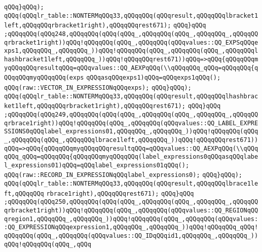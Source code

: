 \verb|qQQq}qQQq);|\newline
\verb|qQQq(qQQqlr_table::NONTERMqQQq33,qQQqqQQq(qQQqresult,qQQqqQQqlbracket1left,qQQqqQQqrbracket1right),qQQqqQQqrest671);|\newline
\verb|qQQq}qQQq|\newline
\verb|;qQQqqQQq(qQQq248,qQQqqQQq(qQQq(qQQq_,qQQqqQQq(qQQq_,qQQqqQQq_,qQQqqQQqrbracket1right))qQQq!qQQqqQQq(qQQq_,qQQqqQQq(qQQqvalues::QQ_EXPSqQQqexps1,qQQqqQQq_,qQQqqQQq_))qQQq!qQQqqQQq(qQQq_,qQQqqQQq(qQQq_,qQQqqQQqlhashbracket1left,qQQqqQQq_))qQQq!qQQqqQQqrest671))qQQq=>qQQq{qQQqqQQqmyqQQqqQQqresultqQQq=qQQqvalues::QQ_AEXPqQQq(\\qQQqqQQq_qQQq=qQQqqQQq{qQQqqQQqmyqQQqqQQq(exps|\newline
\verb|qQQqasqQQqexps1)qQQq=qQQqexps1qQQq();|\newline
\verb|qQQq(raw::VECTOR_IN_EXPRESSIONqQQqexps);|\newline
\verb|qQQq}qQQq);|\newline
\verb|qQQq(qQQqlr_table::NONTERMqQQq33,qQQqqQQq(qQQqresult,qQQqqQQqlhashbracket1left,qQQqqQQqrbracket1right),qQQqqQQqrest671);|\newline
\verb|qQQq}qQQq|\newline
\verb|;qQQqqQQq(qQQq249,qQQqqQQq(qQQq(qQQq_,qQQqqQQq(qQQq_,qQQqqQQq_,qQQqqQQqrbrace1right))qQQq!qQQqqQQq(qQQq_,qQQqqQQq(qQQqvalues::QQ_LABEL_EXPRESSIONS0qQQqlabel_expressions01,qQQqqQQq_,qQQqqQQq_))qQQq!qQQqqQQq(qQQq_,qQQqqQQq(qQQq_,qQQqqQQqlbrace1left,qQQqqQQq_))qQQq!qQQqqQQqrest671))qQQq=>qQQq{qQQqqQQqmyqQQqqQQqresultqQQq=qQQqvalues::QQ_AEXPqQQq(\\qQQq|\newline
\verb|qQQq_qQQq=qQQqqQQq{qQQqqQQqmyqQQqqQQq(label_expressions0qQQqasqQQqlabel_expressions01)qQQq=qQQqlabel_expressions01qQQq();|\newline
\verb|qQQq(raw::RECORD_IN_EXPRESSIONqQQqlabel_expressions0);|\newline
\verb|qQQq}qQQq);|\newline
\verb|qQQq(qQQqlr_table::NONTERMqQQq33,qQQqqQQq(qQQqresult,qQQqqQQqlbrace1left,qQQqqQQq|\newline
\verb|rbrace1right),qQQqqQQqrest671);|\newline
\verb|qQQq}qQQq|\newline
\verb|;qQQqqQQq(qQQq250,qQQqqQQq(qQQq(qQQq_,qQQqqQQq(qQQq_,qQQqqQQq_,qQQqqQQqrbracket1right))qQQq!qQQqqQQq(qQQq_,qQQqqQQq(qQQqvalues::QQ_REGIONqQQqregion1,qQQqqQQq_,qQQqqQQq_))qQQq!qQQqqQQq(qQQq_,qQQqqQQq(qQQqvalues::QQ_EXPRESSIONqQQqexpression1,qQQqqQQq_,qQQqqQQq_))qQQq!qQQqqQQq_qQQq!qQQqqQQq(qQQq_,qQQqqQQq(qQQqvalues::QQ_IDqQQqid1,qQQqqQQq_,qQQqqQQq_))qQQq!qQQqqQQq(qQQq_,qQQq|\newline

